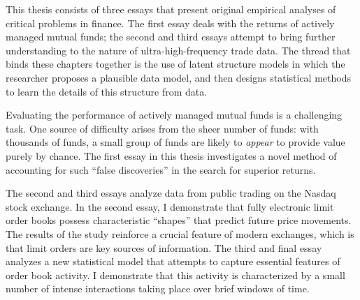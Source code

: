 This thesis consists of three essays that present original empirical analyses of critical problems in finance. The first essay deals with the returns of actively managed mutual funds; the second and third essays attempt to bring further understanding to the nature of ultra-high-frequency trade data. The thread that binds these chapters together is the use of latent structure models in which the researcher proposes a plausible data model, and then designs statistical methods to learn the details of this structure from data.

Evaluating the performance of actively managed mutual funds is a challenging task. One source of difficulty arises from the sheer number of funds: with thousands of funds, a small group of funds are likely to \textit{appear} to provide value purely by chance. The first essay in this thesis investigates a novel method of accounting for such ``false discoveries'' in the search for superior returns.

The second and third essays analyze data from public trading on the Nasdaq stock exchange. In the second essay, I demonstrate that fully electronic limit order books possess characteristic ``shapes'' that predict future price movements. The results of the study reinforce a crucial feature of modern exchanges, which is that limit orders are key sources of information. The third and final essay analyzes a new statistical model that attempts to capture essential features of order book activity. I demonstrate that this activity is characterized by a small number of intense interactions taking place over brief windows of time.
